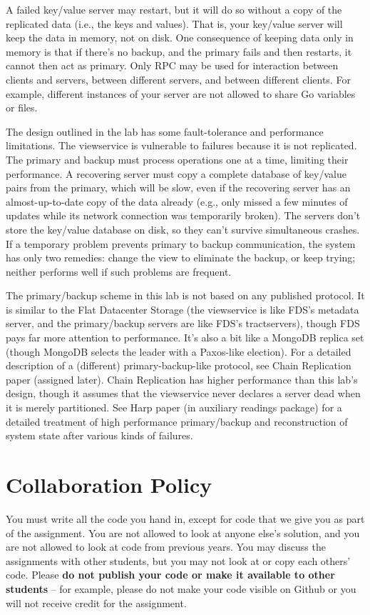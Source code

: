 \documentclass{article}
\begin{document}
A failed key/value server may restart, but it will do so without a copy of the replicated data (i.e., the keys and values). That is, your key/value server will keep the data in memory, not on disk. One consequence of keeping data only in memory is that if there's no backup, and the primary fails and then restarts, it cannot then act as primary. Only RPC may be used for interaction between clients and servers, between different servers, and between different clients. For example, different instances of your server are not allowed to share Go variables or files. 

The design outlined in the lab has some fault-tolerance and performance limitations. The viewservice is vulnerable to failures because it is not replicated. The primary and backup must process operations one at a time, limiting their performance. A recovering server must copy a complete database of key/value pairs from the primary, which will be slow, even if the recovering server has an almost-up-to-date copy of the data already (e.g., only missed a few minutes of updates while its network connection was temporarily broken). The servers don't store the key/value database on disk, so they can't survive simultaneous crashes. If a temporary problem prevents primary to backup communication, the system has only two remedies: change the view to eliminate the backup, or keep trying; neither performs well if such problems are frequent.

The primary/backup scheme in this lab is not based on any published protocol. It is similar to the Flat Datacenter Storage (the viewservice is like FDS's metadata server, and the primary/backup servers are like FDS's tractservers), though FDS pays far more attention to performance. It's also a bit like a MongoDB replica set (though MongoDB selects the leader with a Paxos-like election). For a detailed description of a (different) primary-backup-like protocol, see Chain Replication paper  (assigned later). Chain Replication has higher performance than this lab's design, though it assumes that the viewservice never declares a server dead when it is merely partitioned. See Harp  paper (in auxiliary readings package)  for a detailed treatment of high performance primary/backup and reconstruction of system state after various kinds of failures. 

\section{Collaboration Policy}
You must write all the code you hand in, except for code that we give you as part of the assignment. You are not allowed to look at anyone else's solution, and you are not allowed to look at code from previous years. You may discuss the assignments with other students, but you may not look at or copy each others' code. Please \textbf{do not publish your code or make it available to other students} -- for example, please do not make your code visible on Github or you will not receive credit for the assignment.
\end{document}
